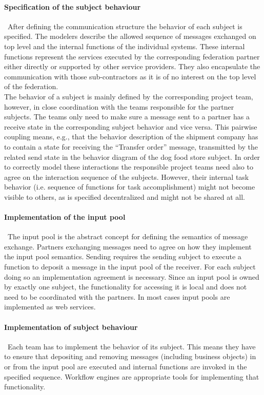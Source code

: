 \paragraph{Specification of the subject behaviour}\
After defining the communication structure the behavior of each subject is specified. The modelers describe the allowed sequence of messages exchanged on top level and the internal functions of the individual systems. These internal functions represent the services executed by the corresponding federation partner either directly or supported by other service providers. They also encapsulate the communication with those sub-contractors as it is of no interest on the top level of the federation.\\
The behavior of a subject is mainly defined by the corresponding project team, however, in close coordination with the teams responsible for the partner subjects. The teams only need to make sure a message sent to a partner has a receive state in the corresponding subject behavior and vice versa. This pairwise coupling means, e.g., that the behavior description of the shipment company has to contain a state for receiving the “Transfer order” message, transmitted by the related send state in the behavior diagram of the dog food store subject. In order to correctly model these interactions the responsible project teams need also to agree on the interaction sequence of the subjects. However, their internal task behavior (i.e. sequence of functions for task accomplishment) might not become visible to others, as is specified decentralized and might not be shared at all.

\paragraph{Implementation of the input pool}\
The input pool is the abstract concept for defining the semantics of message exchange. Partners exchanging messages need to agree on how they implement the input pool semantics. Sending requires the sending subject to execute a function to deposit a message in the input pool of the receiver. For each subject doing so an implementation agreement is necessary. Since an input pool is owned by exactly one subject, the functionality for accessing it is local and does not need to be coordinated with the partners. In most cases input pools are implemented as web services.

\paragraph{Implementation of subject behaviour}\
Each team has to implement the behavior of its subject. This means they have to ensure that depositing and removing messages (including business objects) in or from the input pool are executed and internal functions are invoked in the specified sequence. Workflow engines are appropriate tools for implementing that functionality.\


